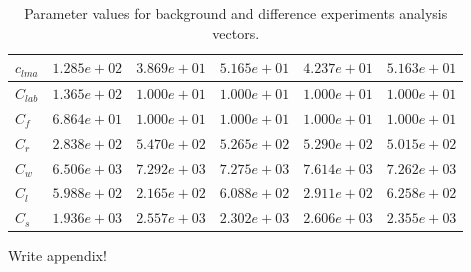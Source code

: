 \documentclass[11pt]{article}
\begin{document}
\begin{table}[ht]
\begin{center}
\begin{tabular}{| l | l | l | l | l | l |}
$c_{lma}$ & $1.285e+02$ & $3.869e+01$ & $5.165e+01$ & $4.237e+01$ & $5.163e+01$ \\ \hline
$C_{lab}$ & $1.365e+02$ & $1.000e+01$ & $1.000e+01$ & $1.000e+01$ & $1.000e+01$ \\ \hline
$C_{f}$ & $6.864e+01$ & $1.000e+01$ & $1.000e+01$ & $1.000e+01$ & $1.000e+01$ \\ \hline
$C_{r}$ & $2.838e+02$ & $5.470e+02$ & $5.265e+02$ & $5.290e+02$ & $5.015e+02$ \\ \hline
$C_{w}$ & $6.506e+03$ & $7.292e+03$ & $7.275e+03$ & $7.614e+03$ & $7.262e+03$ \\ \hline
$C_{l}$ & $5.988e+02$ & $2.165e+02$ & $6.088e+02$ & $2.911e+02$ & $6.258e+02$ \\ \hline
$C_{s}$ & $1.936e+03$ & $2.557e+03$ & $2.302e+03$ & $2.606e+03$ & $2.355e+03$ \\ \hline
	\end{tabular}
	\caption{Parameter values for background and difference experiments analysis vectors.}
	\label{table:exps_tab}
\end{center} 
\end{table}

{\color{red} Write appendix!}
\end{document}

